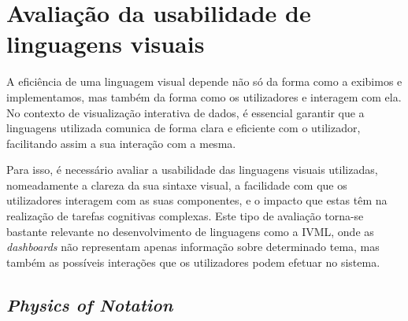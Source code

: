 

\section{Avaliação da usabilidade de linguagens visuais} %
\label{sec:avaliacao_usabilidade}

A eficiência de uma linguagem visual depende não só da forma como a exibimos e implementamos, mas também da forma como os utilizadores e interagem com ela. No contexto de visualização interativa de dados, é essencial garantir que a linguagens utilizada comunica de forma clara e eficiente com o utilizador, facilitando assim a sua interação com a mesma. 

Para isso, é necessário avaliar a usabilidade das linguagens visuais utilizadas, nomeadamente a clareza da sua sintaxe visual, a facilidade com que os utilizadores interagem com as suas componentes, e o impacto que estas têm na realização de tarefas cognitivas complexas. Este tipo de avaliação torna-se bastante relevante no desenvolvimento de linguagens como a \gls{IVML}, onde as \textit{dashboards} não representam apenas informação sobre determinado tema, mas também as possíveis interações que os utilizadores podem efetuar no sistema.

\subsection{\textit{Physics of Notation}} %
\label{sub:physics_notation}


